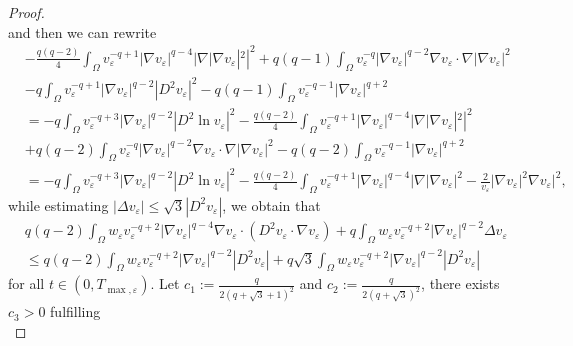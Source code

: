 \documentclass[12pt]{article}
\theoremstyle{plain}
\theoremstyle{definition}
\numberwithin{equation}{section}
\begin{document}
\begin{proof}
\begin{equation*}
    \end{equation*}
     and then we can rewrite
    \begin{align}\label{2.17}
            &-\frac{q(q-2)}{4}\int_\Omega v_\varepsilon^{-q+1}|\nabla v_\varepsilon|^{q-4}|\nabla|\nabla v_\varepsilon|^2|^2+q(q-1)\int_\Omega v_\varepsilon^{-q}|\nabla v_\varepsilon|^{q-2}\nabla v_\varepsilon\cdot\nabla|\nabla v_\varepsilon|^2\nonumber\\
            &-q\int_\Omega v_\varepsilon^{-q+1}|\nabla v_\varepsilon|^{q-2}|D^2 v_\varepsilon|^2-q(q-1)\int_\Omega v_\varepsilon^{-q-1}|\nabla v_\varepsilon|^{q+2}\nonumber\\
            &=-q\int_\Omega v_\varepsilon^{-q+3}|\nabla v_\varepsilon|^{q-2}|D^2\ln v_\varepsilon|^2-\frac{q(q-2)}{4}\int_\Omega v_\varepsilon^{-q+1}|\nabla v_\varepsilon|^{q-4}|\nabla|\nabla v_\varepsilon|^2|^2\\
            &+q(q-2)\int_\Omega v_\varepsilon^{-q}|\nabla v_\varepsilon|^{q-2}\nabla v_\varepsilon\cdot\nabla|\nabla v_\varepsilon|^2-q(q-2)\int_\Omega v_\varepsilon^{-q-1}|\nabla v_\varepsilon|^{q+2}\nonumber\\
            &=-q\int_\Omega v_\varepsilon^{-q+3}|\nabla v_\varepsilon|^{q-2}|D^2\ln v_\varepsilon|^2-\frac{q(q-2)}{4}\int_\Omega v_\varepsilon^{-q+1}|\nabla v_\varepsilon|^{q-4}\bigg|\nabla|\nabla v_\varepsilon|^2-\frac{2}{v_\varepsilon}|\nabla v_\varepsilon|^2\nabla v_\varepsilon\bigg|^2,\nonumber
    \end{align}
    while estimating $|\Delta v_\varepsilon|\leq\sqrt{3}|D^2v_\varepsilon|$, we obtain that
    \begin{equation}\label{2.18}
    \begin{split}
        &q(q-2)\int_\Omega w_\varepsilon v_\varepsilon^{-q+2}|\nabla v_\varepsilon|^{q-4}\nabla v_\varepsilon\cdot(D^2 v_\varepsilon\cdot\nabla v_\varepsilon)+q\int_\Omega w_\varepsilon v_\varepsilon^{-q+2}|\nabla v_\varepsilon|^{q-2}\Delta v_\varepsilon\\
        &\leq q(q-2)\int_\Omega w_\varepsilon v_\varepsilon^{-q+2}|\nabla v_\varepsilon|^{q-2}|D^2v_\varepsilon|+q\sqrt{3}\int_\Omega w_\varepsilon v_\varepsilon^{-q+2}|\nabla v_\varepsilon|^{q-2}|D^2v_\varepsilon|
    \end{split}
    \end{equation}
    for all $t\in(0,T_{\max,\varepsilon})$.  Let $c_1:=\frac{q}{2(q+\sqrt{3}+1)^2}$ and $c_2:=\frac{q}{2(q+\sqrt{3})^2}$, there exists $c_3>0$ fulfilling
    \begin{equation}\label{2.19}

\end{equation}
\end{proof}
\end{document}
